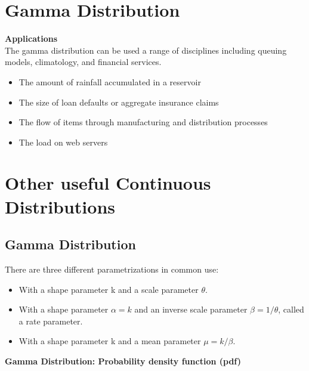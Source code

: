 \documentclass[]{report}
\begin{document}
\newpage
\section{Gamma Distribution}

\textbf{Applications}\\
The gamma distribution can be used a range of disciplines including queuing models, climatology, and financial services. 
\begin{itemize}
\item The amount of rainfall accumulated in a reservoir
\item The size of loan defaults or aggregate insurance claims
\item The flow of items through manufacturing and distribution processes
\item The load on web servers
\end{itemize}

\section{Other useful Continuous Distributions}





\subsection{Gamma Distribution}

There are three different parametrizations in common use: \bigskip
\begin{itemize}
\item With a shape parameter k and a scale parameter $\theta$. \bigskip
\item With a shape parameter $\alpha = k$ and an inverse scale parameter $\beta = 1/\theta$, called a rate parameter. \bigskip
\item With a shape parameter k and a mean parameter $\mu = k/\beta$.
\end{itemize}

\noindent \textbf{Gamma Distribution: Probability density function (pdf)}
\end{document}
